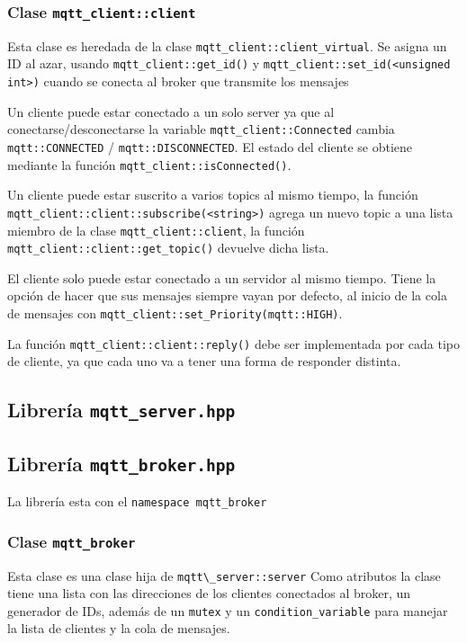     \subsubsection{Clase \texttt{mqtt\_client::client}}

    Esta clase es heredada de la clase \verb|mqtt_client::client_virtual|. Se asigna un ID al azar, usando \verb|mqtt_client::get_id()| y \verb|mqtt_client::set_id(<unsigned int>)|  cuando se conecta al broker que transmite los mensajes

    Un cliente puede estar conectado a un solo server ya que al conectarse/desconectarse la variable \verb|mqtt_client::Connected| cambia \verb|mqtt::CONNECTED| / \verb|mqtt::DISCONNECTED|. El estado del cliente se obtiene mediante la función \verb|mqtt_client::isConnected()|.

    Un cliente puede estar suscrito a varios topics al mismo tiempo, la función \verb|mqtt_client::client::subscribe(<string>)|  agrega un nuevo topic a una lista miembro de la clase \verb|mqtt_client::client|, la función \verb|mqtt_client::client::get_topic()| devuelve dicha lista.

    El cliente solo puede estar conectado a un servidor
    al mismo tiempo. Tiene la opción de hacer que sus mensajes siempre vayan por defecto, al inicio de la cola de mensajes con  \verb|mqtt_client::set_Priority(mqtt::HIGH)|.

    La función \verb|mqtt_client::client::reply()| debe ser implementada por cada tipo de cliente, ya  que cada uno va a tener una forma de responder distinta.


\subsection{Librería \texttt{mqtt\_server.hpp}}

\subsection{Librería \texttt{mqtt\_broker.hpp}}

La librería esta con el \texttt{namespace mqtt\_broker}
\subsubsection{Clase \texttt{mqtt\_broker}}
Esta clase es una clase hija de \verb|mqtt\_server::server|
Como atributos la clase tiene una lista con las direcciones de los clientes conectados al broker, un generador de IDs, además de un \verb|mutex| y un \verb|condition_variable| para manejar la lista de clientes y la cola de mensajes.


